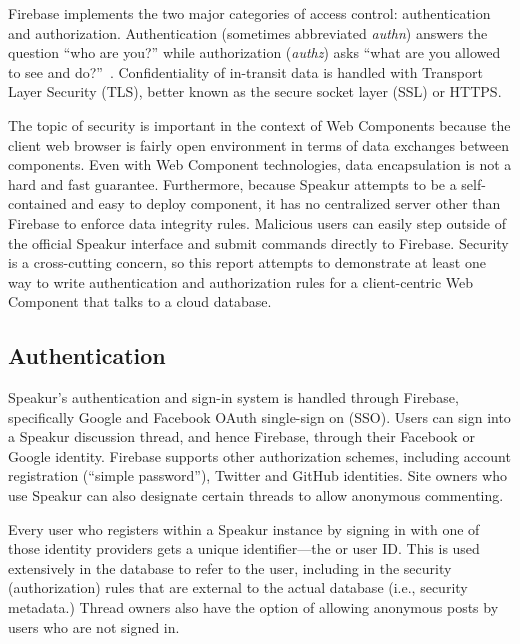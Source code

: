 Firebase implements the two major categories of access control: authentication and 
authorization. 
Authentication (sometimes abbreviated \textit{authn}) answers the question ``who are you?'' 
while authorization (\textit{authz}) asks ``what are you allowed to see and do?''~\cite{stallings2011}.
Confidentiality of in-transit data is handled with Transport Layer Security (TLS), 
better known as the secure socket layer (SSL) or HTTPS.

The topic of security is important in the context of Web Components because the client web browser is fairly open environment in terms of data exchanges between components. 
Even with Web Component technologies, data encapsulation is not a hard and fast guarantee. 
Furthermore, because Speakur attempts to be a self-contained and easy to deploy component, 
it has no centralized server other than Firebase to enforce data integrity rules. 
Malicious users can easily step outside of the official Speakur interface and submit commands directly to Firebase.
Security is a cross-cutting concern, so this report attempts to demonstrate at least one way to write authentication and authorization rules for a client-centric Web Component that talks to a cloud database.

\subsection{Authentication}
Speakur's authentication and sign-in system is handled through Firebase, 
specifically Google and Facebook OAuth single-sign on (SSO).
Users can sign into a Speakur discussion thread, and hence Firebase, through their Facebook or Google identity.
Firebase supports other authorization schemes, including account registration (``simple password''), Twitter and GitHub identities.
Site owners who use Speakur can also designate certain threads to allow anonymous commenting.

Every user who registers within a Speakur instance by signing in with one of those identity providers gets a unique identifier---the  or user ID. 
This  is used extensively in the database to refer to the user, including in the security (authorization) rules that are external to the actual database (i.e., security metadata.) 
Thread owners also have the option of allowing anonymous posts by users who are not signed in.

